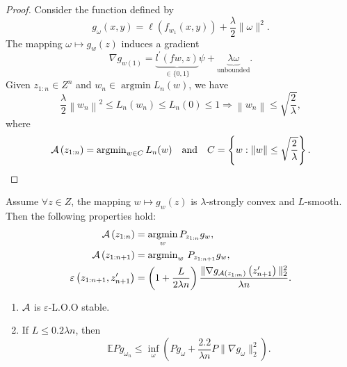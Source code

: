 \documentclass[twoside]{article}
\begin{document}
\begin{proof}

\vspace{5mm}
Consider the function defined by
\begin{equation}
g_{\omega}(x, y) = \ell\left(f_{w_{1}}(x, y)\right) + \frac{\lambda}{2}\|\omega\|^2.
\end{equation}
The mapping $\omega \mapsto g_{w}(z)$ induces a gradient
\begin{equation}
\nabla g_{w(1)} = \underbrace{l^{\prime}(f w, z)}_{\in\{0,1\}} \psi + \underbrace{\lambda \omega}_{\text{unbounded}}.
\end{equation}
Given $z_{1: n} \in Z^{n}$ and $w_{n} \in \operatorname{argmin} L_{n}(w)$, we have
\begin{equation}
\frac{\lambda}{2}\left\|w_{n}\right\|^2 \leq L_n\left(w_{n}\right) \leq L_n(0) \leq 1 \Rightarrow \left\|w_{n}\right\| \leq \sqrt{\frac{2}{\lambda}},
\end{equation}
where
\begin{equation}
\mathcal{A} \left(z_{1:n}\right) = \operatorname{argmin}_{w \in C} L_n(w) \quad \text{and} \quad C = \left\{w : \left\|w\right\| \leq \sqrt{\frac{2}{\lambda}}\right\}.
\end{equation}
\end{proof}



\begin{theorem}
Assume $\forall z \in Z$, the mapping $w \mapsto g_{w}(z)$ is $\lambda$-strongly convex and $L$-smooth. Then the following properties hold:
\begin{align}
    \mathcal{A} \left(z_{1: n}\right) &= \underset{w}{\operatorname{argmin}}\, P_{z_{1:n}} g_{w}, \\
    \mathcal{A} \left(z_{1: n+1}\right) &= \operatorname{argmin}_{w}\, P_{z_{1: n+1}} g_{w}, \\
    \varepsilon\left(z_{1: n+1}, z_{n+1}'\right) &= \left(1+\frac{L}{2\lambda n}\right) \frac{\|\nabla g_{\mathcal{A} \left(z_{1: m}\right)}\left(z_{n+1}'\right)\|_{2}^{2}}{\lambda n}.
\end{align}
\begin{enumerate}
    \item $\mathcal{A}$ is $\varepsilon$-L.O.O stable.
    \item If $L \leq 0.2 \lambda n$, then
    \begin{equation}
        \mathbb{E} P g_{\omega_{n}} \leq \inf_{\omega} \left(P g_{\omega} + \frac{2.2}{\lambda n} P\|\nabla g_{\omega}\|_{2}^{2}\right).
    \end{equation}
\end{enumerate}
\end{theorem}
\end{document}
